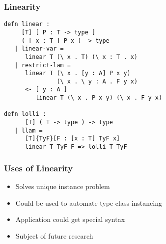 \begin{frame}[fragile]
\frametitle{Linearity}
\begin{lstlisting}
defn linear : 
     [T] [ P : T -> type ] 
     ( [ x : T ] P x ) -> type
   | linear-var = 
      linear T (\ x . T) (\ x : T . x)
   | restrict-lam = 
      linear T (\ x . [y : A] P x y) 
               (\ x . \ y : A . F y x)
      <- [ y : A ] 
         linear T (\ x . P x y) (\ x . F y x)

defn lolli : 
      [T] ( T -> type ) -> type
   | llam = 
      [T]{TyF}[F : [x : T] TyF x]
      linear T TyF F => lolli T TyF
\end{lstlisting}
\end{frame}


\begin{frame}
\frametitle{Uses of Linearity}
\begin{itemize}
\item Solves unique instance problem
\item Could be used to automate type class instancing
\item Application could get special syntax
\item Subject of future research
\end{itemize}
\end{frame}
